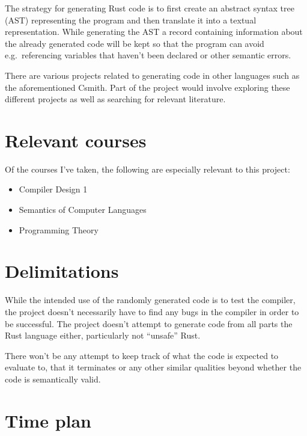 \documentclass{article}
\begin{document}
The strategy for generating Rust code is to first create an abstract syntax tree (AST) representing the program and then translate it into a textual representation. While generating the AST a record containing information about the already generated code will be kept so that the program can avoid e.g.\ referencing variables that haven't been declared or other semantic errors.

There are various projects related to generating code in other languages such as the aforementioned Csmith. Part of the project would involve exploring these different projects as well as searching for relevant literature.

\section*{Relevant courses}

Of the courses I've taken, the following are especially relevant to this project:

\begin{itemize}
    \item Compiler Design 1
    \item Semantics of Computer Languages
    \item Programming Theory
\end{itemize}

\section*{Delimitations}

While the intended use of the randomly generated code is to test the compiler, the project doesn't necessarily have to find any bugs in the compiler in order to be successful. The project doesn't attempt to generate code from all parts the Rust language either, particularly not ``unsafe'' Rust.

There won't be any attempt to keep track of what the code is expected to evaluate to, that it terminates or any other similar qualities beyond whether the code is semantically valid.

\section*{Time plan}
\end{document}
